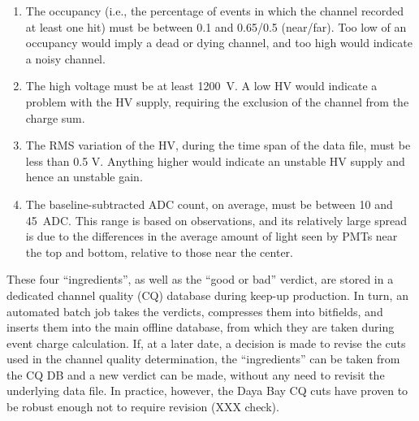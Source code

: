\documentclass[../thesis.tex]{subfiles}
\begin{document}
\begin{enumerate}
\item The occupancy (i.e., the percentage of events in which the channel
  recorded at least one hit) must be between 0.1 and 0.65/0.5 (near/far). Too
  low of an occupancy would imply a dead or dying channel, and too high would
  indicate a noisy channel.
\item The high voltage must be at least 1200~V. A low HV would indicate a
  problem with the HV supply, requiring the exclusion of the channel from the
  charge sum.
\item The RMS variation of the HV, during the time span of the data file, must
  be less than 0.5 V. Anything higher would indicate an unstable HV supply and
  hence an unstable gain.
\item The baseline-subtracted ADC count, on average, must be between 10 and
  45~ADC. This range is based on observations, and its relatively large spread
  is due to the differences in the average amount of light seen by PMTs near the
  top and bottom, relative to those near the center.
\end{enumerate}

These four ``ingredients'', as well as the ``good or bad'' verdict, are stored
in a dedicated channel quality (CQ) database during keep-up production. In turn,
an automated batch job takes the verdicts, compresses them into bitfields, and
inserts them into the main offline database, from which they are taken during
event charge calculation. If, at a later date, a decision is made to revise the
cuts used in the channel quality determination, the ``ingredients'' can be taken
from the CQ DB and a new verdict can be made, without any need to revisit the
underlying data file. In practice, however, the Daya Bay CQ cuts have proven to
be robust enough not to require revision (XXX check).

\subfilebackmatter
\end{document}
